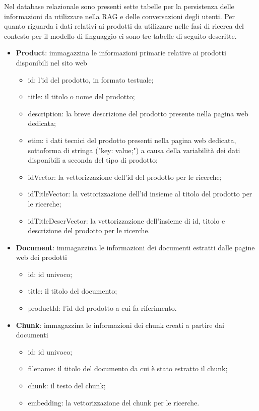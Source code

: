 Nel database relazionale sono presenti sette tabelle per la persistenza delle informazioni da utilizzare nella RAG e delle conversazioni degli utenti.
\newline
Per quanto riguarda i dati relativi ai prodotti da utilizzare nelle fasi di ricerca del contesto per il modello di linguaggio ci sono tre tabelle di seguito descritte.
\begin{itemize}
    \item \textbf{Product}: immagazzina le informazioni primarie relative ai prodotti disponibili nel sito web
    \begin{itemize}
        \item id: l'id del prodotto, in formato testuale;
        \item title: il titolo o nome del prodotto;
        \item description: la breve descrizione del prodotto presente nella pagina web dedicata;
        \item etim: i dati tecnici del prodotto presenti nella pagina web dedicata, sottoforma di stringa ("key: value;") a causa della variabilità dei dati disponibili a seconda del tipo di prodotto;
        \item idVector: la vettorizzazione dell'id del prodotto per le ricerche;
        \item idTitleVector: la vettorizzazione dell'id insieme al titolo del prodotto per le ricerche;
        \item idTitleDescrVector: la vettorizzazione dell'insieme di id, titolo e descrizione del prodotto per le ricerche.
    \end{itemize}
    \item \textbf{Document}: immagazzina le informazioni dei documenti estratti dalle pagine web dei prodotti
     \begin{itemize}
        \item id: id univoco;
        \item title: il titolo del documento;
        \item productId: l'id del prodotto a cui fa riferimento.
    \end{itemize}
    \item \textbf{Chunk}: immagazzina le informazioni dei chunk creati a partire dai documenti
     \begin{itemize}
        \item id: id univoco;
        \item filename: il titolo del documento da cui è stato estratto il chunk;
        \item chunk: il testo del chunk;
        \item embedding: la vettorizzazione del chunk per le ricerche.
    \end{itemize} 
\end{itemize}

